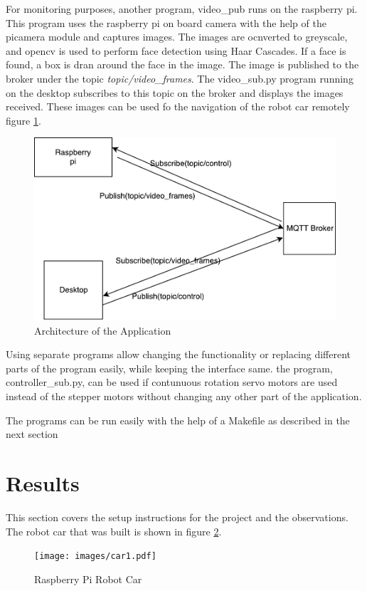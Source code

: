 \documentclass[sigconf]{acmart}
\begin{document}
For monitoring purposes, another program, video\_pub runs on the raspberry pi. This program uses the raspberry pi on board camera with the help of the picamera module and captures images. The images are ocnverted to greyscale, and opencv is used to perform face detection using Haar Cascades. If a face is found, a box is dran around the face in the image. The image is published to the broker under the topic {\em topic/video\_frames}. The video\_sub.py program running on the desktop subscribes to this topic on the broker and displays the images received. These images can be used fo the navigation of the robot car remotely figure \ref{f:arch}.

\begin{figure}[!ht]
  \centering\includegraphics[width=\columnwidth]{images/architecture.pdf}
  \caption{Architecture of the Application}\label{f:arch}
\end{figure}

Using separate programs allow changing the functionality or replacing different parts of the program easily, while keeping the interface same. the program, controller\_sub.py, can be used if contunuous rotation servo motors are used instead of the stepper motors without changing any other part of the application.

The programs can be run easily with the help of a Makefile as described in the next section
\section{Results}
This section covers the setup instructions for the project and the observations. The robot car that was built is shown in figure \ref{f:car1}. %

\begin{figure}[!ht]
  \centering\texttt{[image: images/car1.pdf]}
  \caption{Raspberry Pi Robot Car}\label{f:car1}
\end{figure}
\end{document}
